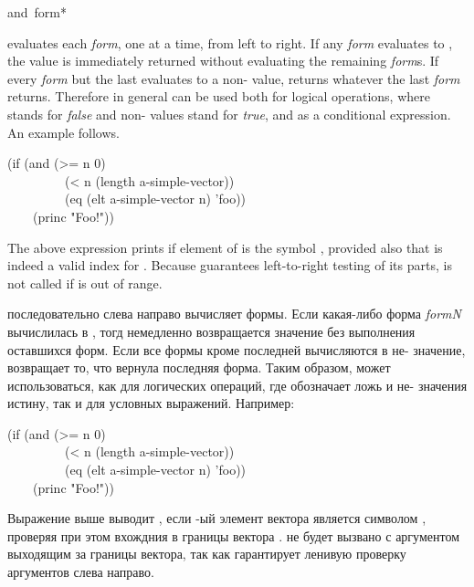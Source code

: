 \begin{defmac}
and {\,form}*

 evaluates each \emph{form}, one at a time,
from left to right.  If any \emph{form} evaluates to {\false}, the value {\nil}
is immediately returned without evaluating the remaining
\emph{form\/}s.  If every \emph{form} but the last evaluates to a non-{\false} value,
 returns whatever the last \emph{form} returns.
Therefore in general  can be used both for logical operations,
where {\false} stands for \emph{false} and non-{\false} values stand for \emph{true},
and as a conditional expression.
An example follows.
\begin{lisp}
(if (and (>= n 0) \\
~~~~~~~~~(< n (length a-simple-vector)) \\
~~~~~~~~~(eq (elt a-simple-vector n) 'foo)) \\
~~~~(princ "Foo!"))
\end{lisp}
The above expression prints  if element  of 
is the symbol , provided also that  is indeed a valid index
for .  Because  guarantees left-to-right testing
of its parts,  is not called if  is out of range.

 последовательно слева направо
вычисляет формы. Если какая-либо форма \emph{formN} вычислилась в {\false},
тогд немедленно возвращается значение {\nil} без выполнения оставшихся форм. Если все
формы кроме последней вычисляются в не-{\false} значение,  возвращает
то, что вернула последняя форма.
Таким образом,  может использоваться, как для логических операций, где
{\false} обозначает ложь и не-{\false} значения истину, так и для условных
выражений.
Например:
\begin{lisp}
(if (and (>= n 0) \\
~~~~~~~~~(< n (length a-simple-vector)) \\
~~~~~~~~~(eq (elt a-simple-vector n) 'foo)) \\
~~~~(princ "Foo!"))
\end{lisp}
Выражение выше выводит , если -ый элемент вектора
 является символом , проверяя при этом вхождния
 в границы вектора .  не будет вызвано с
аргументом  выходящим за границы вектора, так как  гарантирует
ленивую проверку аргументов слева направо.


\end{defmac}
